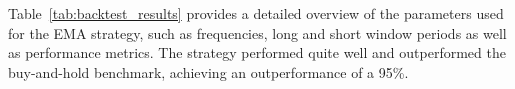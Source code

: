 Table~\ref{tab:backtest_results} provides a detailed overview of the parameters used for the EMA strategy, such as frequencies, long and short window periods as well as performance metrics.
The strategy  performed quite well and outperformed the buy-and-hold benchmark, achieving an outperformance of a 95\%.









